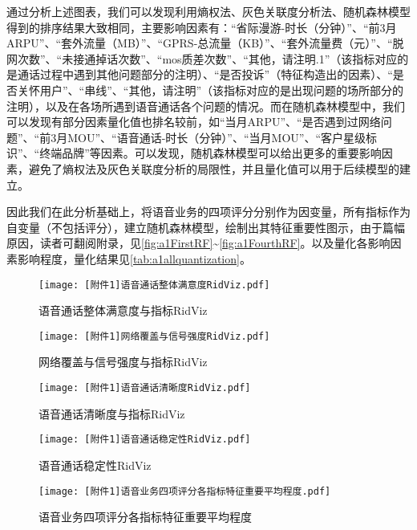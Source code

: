 \documentclass{MathorCupmodeling}
\begin{document}
	通过分析上述图表，我们可以发现利用熵权法、灰色关联度分析法、随机森林模型得到的排序结果大致相同，主要影响因素有：“省际漫游-时长（分钟）”、“前3月ARPU”、“套外流量（MB）”、“GPRS-总流量（KB）”、“套外流量费（元）”、“脱网次数”、“未接通掉话次数”、“mos质差次数”、“其他，请注明.1”（该指标对应的是通话过程中遇到其他问题部分的注明）、“是否投诉”（特征构造出的因素）、“是否关怀用户”、“串线”、“其他，请注明”（该指标对应的是出现问题的场所部分的注明），以及在各场所遇到语音通话各个问题的情况。而在随机森林模型中，我们可以发现有部分因素量化值也排名较前，如“当月ARPU”、“是否遇到过网络问题”、“前3月MOU”、“语音通话-时长（分钟）”、“当月MOU”、“客户星级标识”、“终端品牌”等因素。可以发现，随机森林模型可以给出更多的重要影响因素，避免了熵权法及灰色关联度分析的局限性，并且量化值可以用于后续模型的建立。

	因此我们在此分析基础上，将语音业务的四项评分分别作为因变量，所有指标作为自变量（不包括评分），建立随机森林模型，绘制出其特征重要性图示，由于篇幅原因，读者可翻阅附录，见\textcolor{blue}{\cref{fig:a1FirstRF}}\textasciitilde\textcolor{blue}{\cref{fig:a1FourthRF}}。以及量化各影响因素影响程度，量化结果见\textcolor{blue}{\cref{tab:a1allquantization}}。
	\begin{figure}[htbp]
		\centering
		\begin{minipage}{0.49\linewidth}
			\centering
			\texttt{[image: [附件1]语音通话整体满意度RidViz.pdf]}
			\caption{语音通话整体满意度与指标RidViz}
			\label{fig:a1FirstRid}
		\end{minipage}
		\begin{minipage}{0.49\linewidth}
			\centering
			\texttt{[image: [附件1]网络覆盖与信号强度RidViz.pdf]}
			\caption{网络覆盖与信号强度与指标RidViz}
			\label{fig:a1SecondRid}
		\end{minipage}
		
		\begin{minipage}{0.49\linewidth}
			\centering
			\texttt{[image: [附件1]语音通话清晰度RidViz.pdf]}
			\caption{语音通话清晰度与指标RidViz}
			\label{fig:a1ThirdRid}
		\end{minipage}
		\begin{minipage}{0.49\linewidth}
			\centering
			\texttt{[image: [附件1]语音通话稳定性RidViz.pdf]}
			\caption{语音通话稳定性RidViz}
			\label{fig:a1FourthRid}
		\end{minipage}
	\end{figure}

	\begin{figure}[h!t]
		\centerline{\texttt{[image: [附件1]语音业务四项评分各指标特征重要平均程度.pdf]}}
		\caption{语音业务四项评分各指标特征重要平均程度}\label{fig:a1allRF}
	\end{figure}
\end{document}
